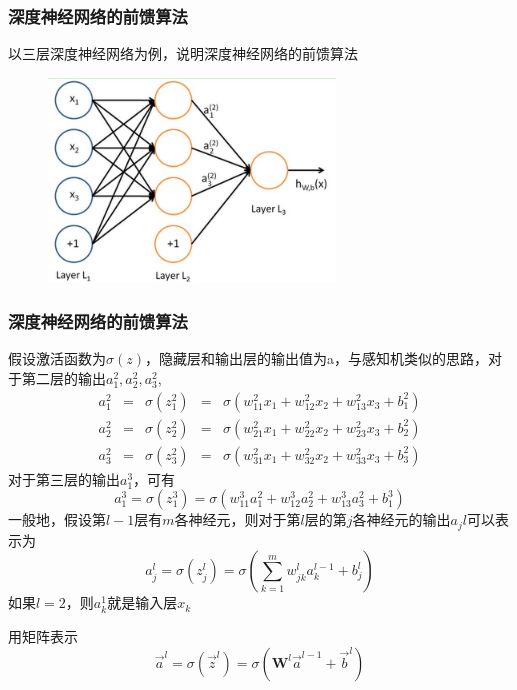 \documentclass[cjk,slidestop,compress,mathserif,blue]{beamer}
\begin{document}
\frame
{
	\frametitle{深度神经网络的前馈算法}
	以三层深度神经网络为例，说明深度神经网络的前馈算法
\begin{figure}[h!]
\vspace*{-0.08in}
\centering
\includegraphics[width=3.0in]{Figures/DNN_front_pro.jpg}
\label{Fig:PLA}
\end{figure}
}

\frame
{
	\frametitle{深度神经网络的前馈算法}
	假设激活函数为$\sigma(z)$，隐藏层和输出层的输出值为a，与感知机类似的思路，对于第二层的输出$a_1^2,a_2^2,a_3^2$,
	\begin{displaymath}
		\begin{matrix}
			a_1^2&=&\sigma(z_1^2)&=&\sigma(w_{11}^2x_1+w_{12}^2x_2+w_{13}^2x_3+b_1^2)\\
			a_2^2&=&\sigma(z_2^2)&=&\sigma(w_{21}^2x_1+w_{22}^2x_2+w_{23}^2x_3+b_2^2)\\
			a_3^2&=&\sigma(z_3^2)&=&\sigma(w_{31}^2x_1+w_{32}^2x_2+w_{33}^2x_3+b_3^2)
		\end{matrix}
	\end{displaymath}
	对于第三层的输出$a_1^3$，可有
	\begin{displaymath}
		a_1^3=\sigma(z_1^3)=\sigma(w_{11}^3a_1^2+w_{12}^3a_2^2+w_{13}^3a_3^2+b_1^3)
	\end{displaymath}
	一般地，假设第$l-1$层有$m$各神经元，则对于第$l$层的第$j$各神经元的输出$a_jl$可以表示为
	\begin{displaymath}
		a_j^l=\sigma(z_j^l)=\sigma(\sum_{k=1}^mw_{jk}^la_k^{l-1}+b_j^l)
	\end{displaymath}
	如果$l=2$，则$a_k^1$就是输入层$x_k$

	用矩阵表示
	\begin{displaymath}
		\vec a^l=\sigma(\vec z^l)=\sigma(\mathbf{W}^l\vec a^{l-1}+\vec b^l)
	\end{displaymath}
}
\end{document}
